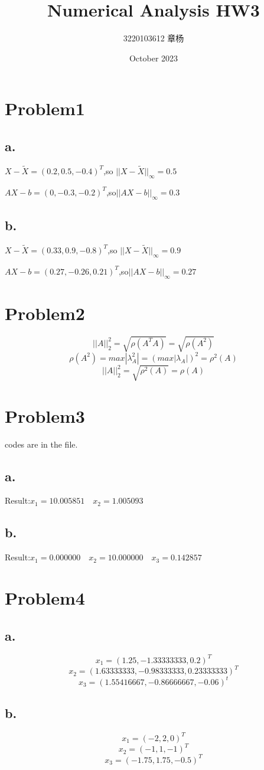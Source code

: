 \documentclass{article}
\title{Numerical Analysis HW3}
\author{3220103612 章杨}
\date{October 2023}
\begin{document}
\maketitle
\large
\section{Problem1}
\subsection{a.}
$X- \widetilde{X}=(0.2,0.5,-0.4)^T$,so $||X- \widetilde{X}||_\infty =0.5$\par
$AX-b=(0,-0.3,-0.2)^T$,so$||AX-b||_\infty =0.3$
\subsection{b.}
$X- \widetilde{X}=(0.33,0.9,-0.8)^T$,so $||X- \widetilde{X}||_\infty =0.9$\par
$AX-b=(0.27,-0.26,0.21)^T$,so$||AX-b||_\infty =0.27$
\section{Problem2}
$$||A||^{2}_{2}=\sqrt{\rho(A^T A)}=\sqrt{\rho(A^2)}$$
$$\rho(A^2)=max |\lambda_A^{2}|=(max|\lambda_A|)^2=\rho^2(A)$$
$$||A||^{2}_{2}=\sqrt{\rho^2(A)}=\rho(A)$$
\section{Problem3}
codes are in the file.
\subsection{a.}
Result:$x_1=10.005851 \quad x_2=1.005093$
\subsection{b.}
Result:$x_1=0.000000 \quad x_2=10.000000 \quad x_3=0.142857 $
\section{Problem4}
\subsection{a.}
$$x_1 = ( 1.25      ,-1.33333333,0.2     )^T$$
$$x_2 = ( 1.63333333,-0.98333333, 0.23333333)^T$$
$$x_3 = ( 1.55416667,-0.86666667,-0.06      )^t$$
\subsection{b.}
$$ x_1=(-2,2,0)^T$$
$$ x_2=(-1,1,-1)^T$$
$$ x_3=(-1.75,1.75,-0.5)^T$$
\end{document}
